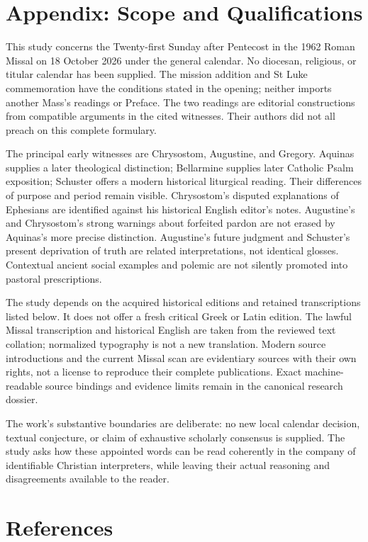 \section{Appendix: Scope and Qualifications}
This study concerns the Twenty-first Sunday after Pentecost in the 1962
Roman Missal on 18 October 2026 under the general calendar. No diocesan,
religious, or titular calendar has been supplied. The mission addition
and St Luke commemoration have the conditions stated in the opening;
neither imports another Mass's readings or Preface. The two readings
are editorial constructions from compatible arguments in the cited
witnesses. Their authors did not all preach on this complete formulary.

The principal early witnesses are Chrysostom, Augustine, and Gregory.
Aquinas supplies a later theological distinction; Bellarmine supplies
later Catholic Psalm exposition; Schuster offers a modern historical
liturgical reading. Their differences of purpose and period remain
visible. Chrysostom's disputed explanations of Ephesians are identified
against his historical English editor's notes. Augustine's and
Chrysostom's strong warnings about forfeited pardon are not erased by
Aquinas's more precise distinction. Augustine's future judgment and
Schuster's present deprivation of truth are related interpretations,
not identical glosses. Contextual ancient social examples and polemic
are not silently promoted into pastoral prescriptions.

The study depends on the acquired historical editions and retained
transcriptions listed below. It does not offer a fresh critical Greek
or Latin edition. The lawful Missal transcription and historical English
are taken from the reviewed text collation; normalized typography is
not a new translation. Modern source introductions and the current
Missal scan are evidentiary sources with their own rights, not a license
to reproduce their complete publications. Exact machine-readable source
bindings and evidence limits remain in the canonical research dossier.

The work's substantive boundaries are deliberate: no new local calendar
decision, textual conjecture, or claim of exhaustive scholarly consensus
is supplied. The study asks how these appointed words can be read
coherently in the company of identifiable Christian interpreters,
while leaving their actual reasoning and disagreements available to
the reader.

\section{References}

